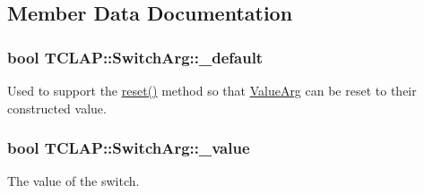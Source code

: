 \subsection{Member Data Documentation}
\hypertarget{class_t_c_l_a_p_1_1_switch_arg_ae25a99eb06fc2ee75a3b98edba1d5d8d}{
\subsubsection[{\+\_\+default}]{\setlength{\rightskip}{0pt plus 5cm}bool T\+C\+L\+A\+P\+::\+Switch\+Arg\+::\+\_\+default\hspace{0.3cm}{\ttfamily [protected]}}}\label{class_t_c_l_a_p_1_1_switch_arg_ae25a99eb06fc2ee75a3b98edba1d5d8d}
Used to support the \hyperlink{class_t_c_l_a_p_1_1_switch_arg_af8561d903ec3c11f5f2175e6db179d9c}{reset()} method so that \hyperlink{class_t_c_l_a_p_1_1_value_arg}{Value\+Arg} can be reset to their constructed value. \hypertarget{class_t_c_l_a_p_1_1_switch_arg_a0389ecebecc504d9756703d46e8cf3ca}{
\subsubsection[{\+\_\+value}]{\setlength{\rightskip}{0pt plus 5cm}bool T\+C\+L\+A\+P\+::\+Switch\+Arg\+::\+\_\+value\hspace{0.3cm}{\ttfamily [protected]}}}\label{class_t_c_l_a_p_1_1_switch_arg_a0389ecebecc504d9756703d46e8cf3ca}
The value of the switch. 